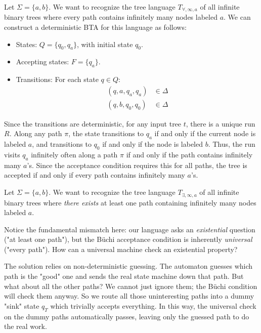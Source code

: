 \begin{example}
Let $\Sigma = \{a, b\}$. We want to recognize the tree language $T_{\forall, \infty, a}$ of all infinite binary trees where every path contains infinitely many nodes labeled $a$.
We can construct a deterministic BTA for this language as follows:
\begin{itemize}
    \item States: $Q = \{q_0, q_a\}$, with initial state $q_0$.
    \item Accepting states: $F = \{q_a\}$.
    \item Transitions: For each state $q \in Q$:
    \begin{align*}
        (q, a, q_a, q_a) &\in \Delta \\
        (q, b, q_0, q_0) &\in \Delta
    \end{align*}
\end{itemize}
Since the transitions are deterministic, for any input tree $t$, there is a unique run $R$. Along any path $\pi$, the state transitions to $q_a$ if and only if the current node is labeled $a$, and transitions to $q_0$ if and only if the node is labeled $b$. Thus, the run visits $q_a$ infinitely often along a path $\pi$ if and only if the path contains infinitely many $a$'s. Since the acceptance condition requires this for all paths, the tree is accepted if and only if every path contains infinitely many $a$'s.
\end{example}

\begin{example}
\label{ex:buchi-infinitely-many-existential}
Let $\Sigma = \{a, b\}$. We want to recognize the tree language $T_{\exists, \infty, a}$ of all infinite binary trees where \emph{there exists} at least one path containing infinitely many nodes labeled $a$.

Notice the fundamental mismatch here: our language asks an \emph{existential} question ("at least one path"), but the Büchi acceptance condition is inherently \emph{universal} ("every path"). How can a universal machine check an existential property?

The solution relies on non-deterministic guessing. The automaton guesses which path is the "good" one and sends the real state machine down that path. But what about all the other paths? We cannot just ignore them; the Büchi condition will check them anyway. So we route all those uninteresting paths into a dummy "sink" state $q_T$ which trivially accepts everything. In this way, the universal check on the dummy paths automatically passes, leaving only the guessed path to do the real work.
\end{example}

